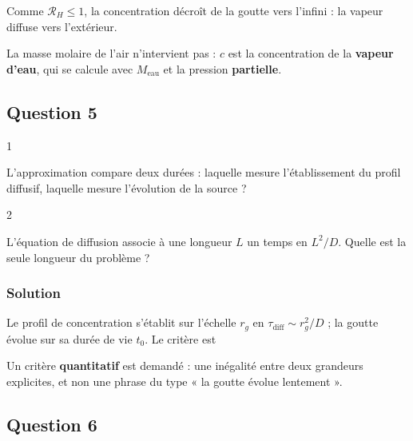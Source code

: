 \documentclass[11pt,a4paper]{article}
\newcommand{\equationajustee}[1]{%
  \sbox{\boiteequation}{$\displaystyle #1$}%
  \ifdim\wd\boiteequation>\linewidth
    \[\resizebox{\linewidth}{!}{\usebox{\boiteequation}}\]%
  \else
    \[#1\]%
  \fi}
\begin{document}
Comme \(\mathcal R_H\le1\), la concentration décroît de la goutte vers l'infini : la vapeur diffuse vers l'extérieur.

\begin{piege}

La masse molaire de l'air n'intervient pas : \(c\) est la concentration de la \textbf{vapeur d'eau}, qui se calcule avec \(M_{\text{eau}}\) et la pression \textbf{partielle}.

\end{piege}

\hypertarget{question-5}{%
\subsection{Question 5}\label{question-5}}

\begin{indication}{1}

L'approximation compare deux durées : laquelle mesure l'établissement du profil diffusif, laquelle mesure l'évolution de la source ?

\end{indication}

\begin{indication}{2}

L'équation de diffusion associe à une longueur \(L\) un temps en \(L^2/D\). Quelle est la seule longueur du problème ?

\end{indication}

\hypertarget{solution-4}{%
\subsubsection{Solution}\label{solution-4}}

Le profil de concentration s'établit sur l'échelle \(r_g\) en \(\tau_{\text{diff}}\sim r_g^2/D\) ; la goutte évolue sur sa durée de vie \(t_0\). Le critère est

\equationajustee{\boxed{\tau_{\text{diff}}=\frac{r_{g0}^2}{D}\ll t_0}}

\begin{jury}

Un critère \textbf{quantitatif} est demandé : une inégalité entre deux grandeurs explicites, et non une phrase du type « la goutte évolue lentement ».

\end{jury}

\hypertarget{question-6}{%
\subsection{Question 6}\label{question-6}}
\end{document}
